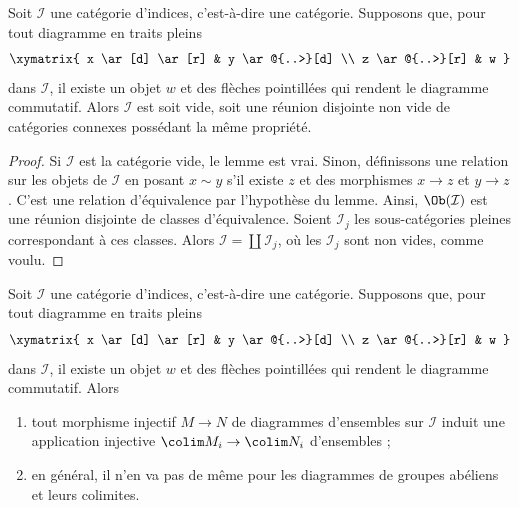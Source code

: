 \begin{lemma}
\label{lemma-split-into-connected}
Soit $\mathcal{I}$ une catégorie d'indices, c'est-à-dire une catégorie.
Supposons que, pour tout diagramme en traits pleins
$$
\xymatrix{
x \ar[d] \ar[r] & y \ar@{..>}[d] \\
z \ar@{..>}[r] & w
}
$$
dans $\mathcal{I}$, il existe un objet $w$ et des flèches pointillées
qui rendent le diagramme commutatif. Alors $\mathcal{I}$ est soit vide,
soit une réunion disjointe non vide de catégories connexes possédant
la même propriété.
\end{lemma}

\begin{proof}
Si $\mathcal{I}$ est la catégorie vide, le lemme est vrai.
Sinon, définissons une relation sur les objets de $\mathcal{I}$ en posant
$x \sim y$ s'il existe $z$ et des morphismes
$x \to z$ et $y \to z$. C'est une relation d'équivalence
par l'hypothèse du lemme. Ainsi, $\Ob(\mathcal{I})$
est une réunion disjointe de classes d'équivalence. Soient
$\mathcal{I}_j$ les sous-catégories pleines correspondant à ces classes.
Alors $\mathcal{I} = \coprod \mathcal{I}_j$, où les $\mathcal{I}_j$
sont non vides, comme voulu.
\end{proof}

\begin{lemma}
\label{lemma-preserve-injective-maps}
Soit $\mathcal{I}$ une catégorie d'indices, c'est-à-dire une catégorie.
Supposons que, pour tout diagramme en traits pleins
$$
\xymatrix{
x \ar[d] \ar[r] & y \ar@{..>}[d] \\
z \ar@{..>}[r] & w
}
$$
dans $\mathcal{I}$, il existe un objet $w$ et des flèches pointillées
qui rendent le diagramme commutatif. Alors
\begin{enumerate}
\item tout morphisme injectif $M \to N$ de diagrammes d'ensembles sur
$\mathcal{I}$ induit une application injective
$\colim M_i \to \colim N_i$ d'ensembles ;
\item en général, il n'en va pas de même pour les diagrammes de groupes
abéliens et leurs colimites.
\end{enumerate}
\end{lemma}


